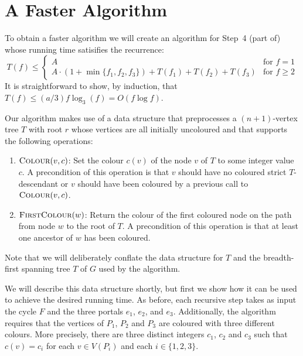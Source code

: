 \documentclass[kpfonts]{patmorin}
\let\le\leqslant
\let\ge\geqslant
\begin{document}
\section{A Faster Algorithm}

To obtain a faster algorithm we will create an algorithm for Step~4 (part of) whose running time satisifies the recurrence:
\[  T(f) \le \begin{cases}
           A & \text{for $f=1$} \\
           A\cdot(1+\min\{f_1,f_2,f_3\}) + T(f_1)+T(f_2)+T(f_3) & \text{for $f\ge 2$}
         \end{cases}
 \]
  It is straightforward to show, by induction, that $T(f)\le (a/3)f\log_3(f)=O(f\log f)$.  

 Our algorithm makes use of a data structure that preprocesses a $(n+1)$-vertex tree $T$ with root $r$ whose vertices are all initially uncoloured and that supports the following operations:
 \begin{enumerate}
   \item $\textsc{Colour}(v,c)$: Set the colour $c(v)$ of the node $v$ of $T$ to some integer value $c$.  A precondition of this operation is that $v$ should have no coloured strict $T$-descendant or $v$ should have been coloured by a previous call to $\textsc{Colour}(v,c)$.

   \item $\textsc{FirstColour}(w)$: Return the colour of the first coloured node on the path from node $w$ to the root of $T$.  A precondition of this operation is that at least one ancestor of $w$ has been coloured.
 \end{enumerate}
 
 Note that we will deliberately conflate the data structure for $T$ and the breadth-first spanning tree $T$ of $G$ used by the algorithm.
 
 We will describe this data structure shortly, but first we show how it can be used to achieve the desired running time.  As before, each recursive step takes as input the cycle $F$ and the three portals $e_1$, $e_2$, and $e_3$.  Additionally, the algorithm requires that the vertices of $P_1$, $P_2$ and $P_3$ are coloured with three different colours.  More precisely, there are three distinct integers $c_1$, $c_2$ and $c_3$ such that $c(v)=c_i$ for each $v\in V(P_i)$ and each $i\in\{1,2,3\}$.
 
\end{document}
